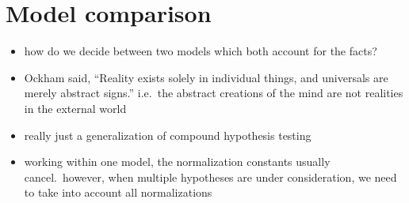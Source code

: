 \documentclass[../jaynes_prob_theory_notes.tex]{subfiles}
\begin{document}
    \section{Model comparison}
        \begin{itemize} 
            \item how do we decide between two models which both account for the facts?
            \item Ockham said, ``Reality exists solely in individual things, and universals are merely abstract signs.'' i.e.\ the abstract creations of the mind are not realities in the external world
            \item really just a generalization of compound hypothesis testing
            \item working within one model, the normalization constants usually cancel.\ however, when multiple hypotheses are under consideration, we need to take into account all normalizations
        \end{itemize}
\end{document}
